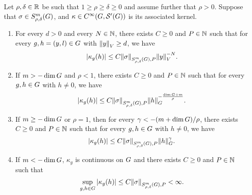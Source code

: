 \begin{theorem}
\label{theorem:kernel_estimates}
    Let $\rho, \delta \in \R$ be such that $1 \geq \rho \geq \delta \geq 0$
    and assume further that $\rho > 0$.
    Suppose that $\sigma \in \SymbolClass{m}{\rho, \delta}$,
    and $\kappa \in \SmoothFunctions {\Group, \TemperedDistributions \Group}$ is its associated kernel.
    \begin{enumerate}
        \item \label{item:kernel_estimates:at_infinity}
            For every $d > 0$ and every $N \in \N$,
            there exists $C \geq 0$ and $P \in \N$ such that for every $g, h = (y, l) \in \Group$ with $\norm {y} \geq d$, we have
            \begin{align*}
                \abs{\kappa_g(h)} \leq C \SymbolSemiNorm m {\rho, \delta} P \sigma \norm y^{-N}.
            \end{align*}
        \item \label{item:kernel_estimates:at_origin:positive}
            If $m > - \dim \Group$ and $\rho < 1$, there exists $C \geq 0$ and $P \in \N$ such that for every $g, h \in \Group$ with $h \neq 0$, we have
            \begin{align*}
                \abs{\kappa_g(h)} \leq C \SymbolSemiNorm m {\rho, \delta} P \sigma \norm [\Group] h^{- \frac{\dim \Group + m}{\rho}}.
            \end{align*}
        \item \label{item:kernel_estimates:at_origin:zero}
            If $m \geq -\dim \Group$ or $\rho = 1$,
            then for every $\gamma < -(m + \dim \Group)/\rho$,
            there exists $C \geq 0$ and $P \in \N$ such that for every $g, h \in \Group$ with $h \neq 0$, we have
            \begin{align*}
                \abs{\kappa_g(h)} \leq C \SymbolSemiNorm m {\rho, \delta} P \sigma \norm [\Group] h^\gamma.
            \end{align*}
        \item \label{item:kernel_estimates:at_origin:negative}
            If $m < -\dim \Group$, $\kappa_g$ is continuous on $\Group$
            and there exists $C \geq 0$ and $P \in \N$ such that
            \begin{align*}
                \sup_{g, h \in \Group} \abs{\kappa_g(h)} \leq C \SymbolSemiNorm m {\rho, \delta} P \sigma < \infty.
            \end{align*}
    \end{enumerate}
\end{theorem}


